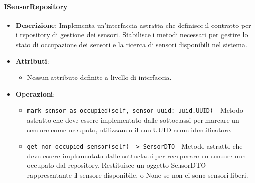 \documentclass[10pt]{article}
\begin{document}
    \paragraph{ISensorRepository}
    \begin{itemize} 
    \item \textbf{Descrizione}: Implementa un'interfaccia astratta che definisce il contratto per i repository di gestione dei sensori. Stabilisce i metodi necessari per gestire lo stato di occupazione dei sensori e la ricerca di sensori disponibili nel sistema.
    \item \textbf{Attributi}:
    \begin{itemize}
        \item Nessun attributo definito a livello di interfaccia.
    \end{itemize}
    
    \item \textbf{Operazioni}:
    \begin{itemize}
        \item \texttt{mark\_sensor\_as\_occupied(self, sensor\_uuid: uuid.UUID)} - Metodo astratto che deve essere implementato dalle sottoclassi per marcare un sensore come occupato, utilizzando il suo UUID come identificatore.
        
        \item \texttt{get\_non\_occupied\_sensor(self) -> SensorDTO} - Metodo astratto che deve essere implementato dalle sottoclassi per recuperare un sensore non occupato dal repository. Restituisce un oggetto SensorDTO rappresentante il sensore disponibile, o None se non ci sono sensori liberi.
    \end{itemize}
    \end{itemize}

    
\end{document}
